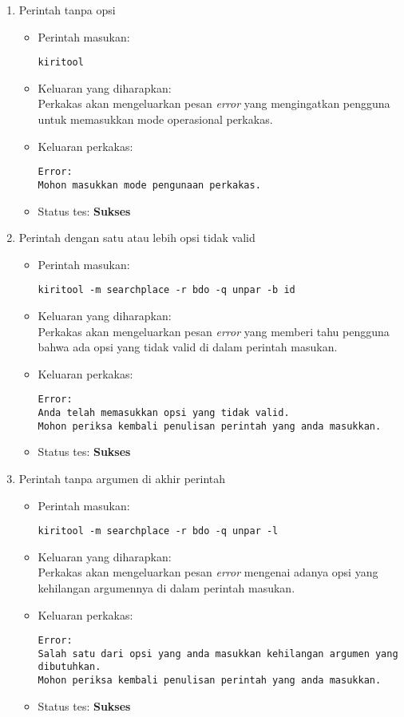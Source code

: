 \begin{enumerate}
	\item Perintah tanpa opsi
	\begin{itemize}
		\item Perintah masukan:
		\begin{verbatim}
kiritool
		\end{verbatim}
		\item Keluaran yang diharapkan: \\
		Perkakas akan mengeluarkan pesan \textit{error} yang mengingatkan pengguna untuk memasukkan mode operasional perkakas.
		\item Keluaran perkakas:
		\begin{lstlisting}
Error:
Mohon masukkan mode pengunaan perkakas.
		\end{lstlisting}
		\item Status tes: \textbf{Sukses}
	\end{itemize}
	
	\item Perintah dengan satu atau lebih opsi tidak valid
	\begin{itemize}
		\item Perintah masukan:
		\begin{verbatim}
kiritool -m searchplace -r bdo -q unpar -b id
		\end{verbatim}
		\item Keluaran yang diharapkan: \\
		Perkakas akan mengeluarkan pesan \textit{error} yang memberi tahu pengguna bahwa ada opsi yang tidak valid di dalam perintah masukan.
		\item Keluaran perkakas:
		\begin{lstlisting}
Error:
Anda telah memasukkan opsi yang tidak valid.
Mohon periksa kembali penulisan perintah yang anda masukkan.
		\end{lstlisting}
		\item Status tes: \textbf{Sukses}
	\end{itemize}
	
	\item Perintah tanpa argumen di akhir perintah
	\begin{itemize}
		\item Perintah masukan:
		\begin{verbatim}
kiritool -m searchplace -r bdo -q unpar -l
		\end{verbatim}
		\item Keluaran yang diharapkan: \\
		Perkakas akan mengeluarkan pesan \textit{error} mengenai adanya opsi yang kehilangan argumennya di dalam perintah masukan.
		\item Keluaran perkakas:
		\begin{lstlisting}
Error:
Salah satu dari opsi yang anda masukkan kehilangan argumen yang dibutuhkan.
Mohon periksa kembali penulisan perintah yang anda masukkan.
		\end{lstlisting}
		\item Status tes: \textbf{Sukses}
	\end{itemize}
	

\end{enumerate}
